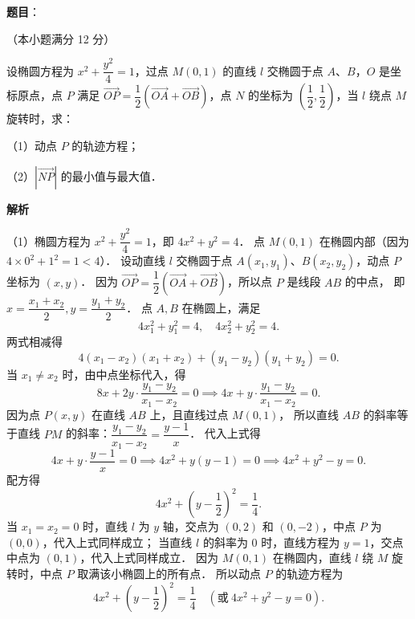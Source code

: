 \begin{answer}

\textbf{题目}：

（本小题满分 12 分）

设椭圆方程为 $x^2 + \dfrac{y^2}{4} = 1$，过点 $M(0, 1)$ 的直线 $l$ 交椭圆于点 $A$、$B$，$O$ 是坐标原点，点 $P$ 满足 $\vec{OP} = \dfrac{1}{2}(\vec{OA} + \vec{OB})$，点 $N$ 的坐标为 $\left(\dfrac{1}{2}, \dfrac{1}{2}\right)$，当 $l$ 绕点 $M$ 旋转时，求：

（1）动点 $P$ 的轨迹方程；

（2）$|\vec{NP}|$ 的最小值与最大值．

\textbf{解析}

（1）椭圆方程为 $x^2 + \dfrac{y^2}{4} = 1$，即 $4x^2 + y^2 = 4$．
点 $M(0, 1)$ 在椭圆内部（因为 $4 \times 0^2 + 1^2 = 1 < 4$）．
设动直线 $l$ 交椭圆于点 $A(x_1, y_1)$、$B(x_2, y_2)$，动点 $P$ 坐标为 $(x, y)$．
因为 $\vec{OP} = \dfrac{1}{2}(\vec{OA} + \vec{OB})$，所以点 $P$ 是线段 $AB$ 的中点，
即 $x = \dfrac{x_1 + x_2}{2}, y = \dfrac{y_1 + y_2}{2}$．
点 $A, B$ 在椭圆上，满足
\nopagebreak[4]
\[
4x_1^2 + y_1^2 = 4, \quad 4x_2^2 + y_2^2 = 4.
\]
两式相减得
\nopagebreak[4]
\[
4(x_1 - x_2)(x_1 + x_2) + (y_1 - y_2)(y_1 + y_2) = 0.
\]
当 $x_1 \neq x_2$ 时，由中点坐标代入，得
\nopagebreak[4]
\[
8x + 2y \cdot \frac{y_1 - y_2}{x_1 - x_2} = 0 \implies 4x + y \cdot \frac{y_1 - y_2}{x_1 - x_2} = 0.
\]
因为点 $P(x, y)$ 在直线 $AB$ 上，且直线过点 $M(0, 1)$，
所以直线 $AB$ 的斜率等于直线 $PM$ 的斜率：$\dfrac{y_1 - y_2}{x_1 - x_2} = \dfrac{y - 1}{x}$．
代入上式得
\nopagebreak[4]
\[
4x + y \cdot \frac{y - 1}{x} = 0 \implies 4x^2 + y(y - 1) = 0 \implies 4x^2 + y^2 - y = 0.
\]
配方得
\nopagebreak[4]
\[
4x^2 + \left(y - \frac{1}{2}\right)^2 = \frac{1}{4}.
\]
当 $x_1 = x_2 = 0$ 时，直线 $l$ 为 $y$ 轴，交点为 $(0, 2)$ 和 $(0, -2)$，中点 $P$ 为 $(0, 0)$，代入上式同样成立；
当直线 $l$ 的斜率为 0 时，直线方程为 $y = 1$，交点中点为 $(0, 1)$，代入上式同样成立．
因为 $M(0, 1)$ 在椭圆内，直线 $l$ 绕 $M$ 旋转时，中点 $P$ 取满该小椭圆上的所有点．
所以动点 $P$ 的轨迹方程为
\nopagebreak[4]
\[
4x^2 + \left(y - \frac{1}{2}\right)^2 = \frac{1}{4} \quad (\text{或}\ 4x^2 + y^2 - y = 0).
\]


\end{answer}
